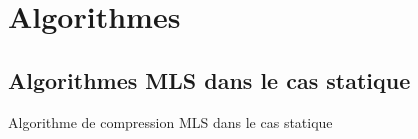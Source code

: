 \chapter{Algorithmes}\label{chap:algos}

\section{Algorithmes MLS dans le cas statique}\label{sec:mls_algo}

	\begin{algorithm}[htb!]\label{algo:mls_compress}



		\caption{Algorithme de compression MLS dans le cas statique}
	\end{algorithm}


\newpage

